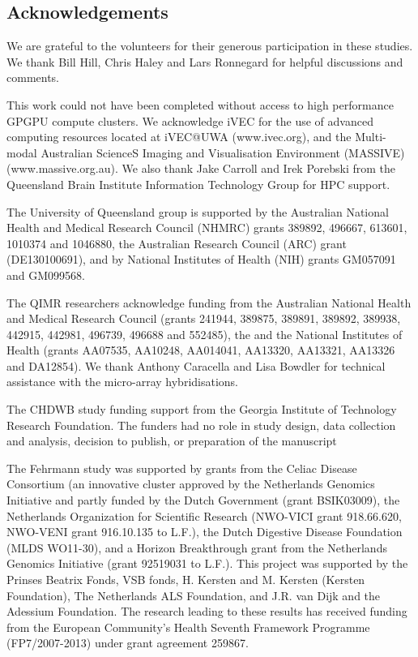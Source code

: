 \documentclass{article}
\begin{document}
\subsection*{Acknowledgements}

We are grateful to the volunteers for their generous participation in these studies. We thank Bill Hill, Chris Haley and Lars Ronnegard for helpful discussions and comments.

This work could not have been completed without access to high performance GPGPU compute clusters. We acknowledge iVEC for the use of advanced computing resources located at iVEC@UWA (www.ivec.org), and the Multi-modal Australian ScienceS Imaging and Visualisation Environment (MASSIVE) (www.massive.org.au). We also thank Jake Carroll and Irek Porebski from the Queensland Brain Institute Information Technology Group for HPC support.

The University of Queensland group is supported by the Australian National Health and Medical Research Council (NHMRC) grants 389892, 496667, 613601, 1010374 and 1046880, the Australian Research Council (ARC) grant (DE130100691), and by National Institutes of Health (NIH) grants GM057091 and GM099568.

The QIMR researchers acknowledge funding from the Australian National Health and Medical Research Council (grants 241944, 389875, 389891, 389892, 389938, 442915, 442981, 496739, 496688 and 552485), the and the National Institutes of Health (grants AA07535, AA10248, AA014041, AA13320, AA13321, AA13326 and DA12854). We thank Anthony Caracella and Lisa Bowdler for technical assistance with the micro-array hybridisations.

The CHDWB study funding support from the Georgia Institute of Technology Research Foundation. The funders had no role in study design, data collection and analysis, decision to publish, or preparation of the manuscript

The Fehrmann study was supported by grants from the Celiac Disease Consortium (an innovative cluster approved by the Netherlands Genomics Initiative and partly funded by the Dutch Government (grant BSIK03009), the Netherlands Organization for Scientific Research (NWO-VICI grant 918.66.620, NWO-VENI grant 916.10.135 to L.F.), the Dutch Digestive Disease Foundation (MLDS WO11-30), and a Horizon Breakthrough grant from the Netherlands Genomics Initiative (grant 92519031 to L.F.). This project was supported by the Prinses Beatrix Fonds, VSB fonds, H. Kersten and M. Kersten (Kersten Foundation), The Netherlands ALS Foundation, and J.R. van Dijk and the Adessium Foundation. The research leading to these results has received funding from the European Community’s Health Seventh Framework Programme (FP7/2007-2013) under grant agreement 259867.
\end{document}
